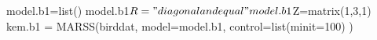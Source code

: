 \begin{Schunk}
\begin{Sinput}
 model.b1=list()
 model.b1$R="diagonal and equal"
 model.b1$Z=matrix(1,3,1)
 kem.b1 = MARSS(birddat, model=model.b1, control=list(minit=100) )
\end{Sinput}
\end{Schunk}
